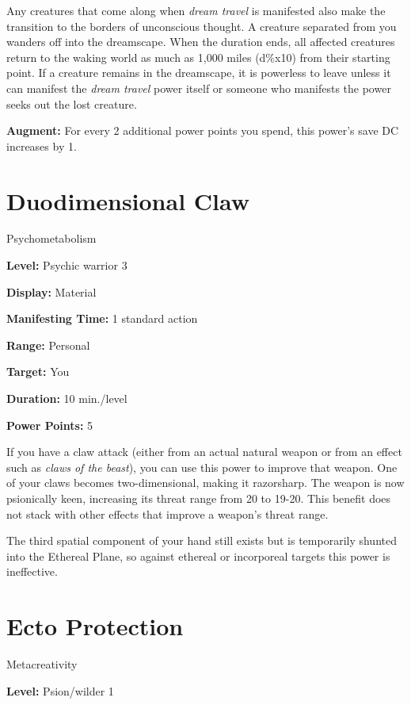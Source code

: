 \documentclass{article}
\begin{document}
Any creatures that come along when \textit{dream travel }is manifested also make 
the transition to the borders of unconscious thought. A creature separated from 
you wanders off into the dreamscape. When the duration ends, all affected creatures 
return to the waking world as much as 1,000 miles (d\%x10) from their starting 
point. If a creature remains in the dreamscape, it is powerless to leave unless 
it can manifest the \textit{dream travel }power itself or someone who manifests 
the power seeks out the lost creature.

\textbf{Augment:} For every 2 additional power points you spend, this power's save 
DC increases by 1.

\vspace{12pt}
\section*{Duodimensional Claw}

Psychometabolism

\textbf{Level:} Psychic warrior 3

\textbf{Display:} Material

\textbf{Manifesting Time:} 1 standard action

\textbf{Range:} Personal

\textbf{Target:} You

\textbf{Duration:} 10 min./level

\textbf{Power Points:} 5

If you have a claw attack (either from an actual natural weapon or from an effect 
such as \textit{claws of the beast}), you can use this power to improve that weapon. 
One of your claws becomes two-dimensional, making it razorsharp. The weapon is 
now psionically keen, increasing its threat range from 20 to 19-20. This benefit 
does not stack with other effects that improve a weapon's threat range.

The third spatial component of your hand still exists but is temporarily shunted 
into the Ethereal Plane, so against ethereal or incorporeal targets this power 
is ineffective.

\vspace{12pt}
\section*{Ecto Protection}

Metacreativity

\textbf{Level:} Psion/wilder 1
\end{document}
